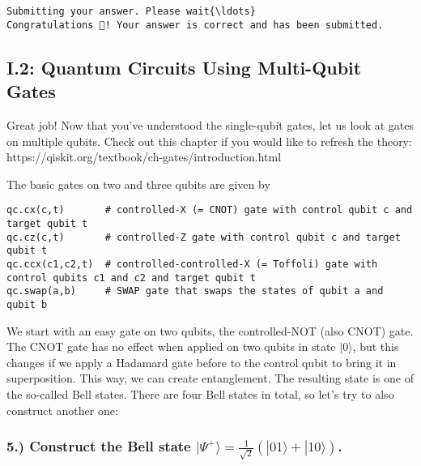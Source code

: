 \documentclass[11pt]{article}
\begin{document}
    \begin{Verbatim}[commandchars=\\\{\}]
Submitting your answer. Please wait{\ldots}
Congratulations 🎉! Your answer is correct and has been submitted.
    \end{Verbatim}

    \hypertarget{i.2-quantum-circuits-using-multi-qubit-gates}{%
\subsection{I.2: Quantum Circuits Using Multi-Qubit
Gates}\label{i.2-quantum-circuits-using-multi-qubit-gates}}

Great job! Now that you've understood the single-qubit gates, let us
look at gates on multiple qubits. Check out this chapter if you would
like to refresh the theory:
https://qiskit.org/textbook/ch-gates/introduction.html

The basic gates on two and three qubits are given by

\begin{verbatim}
qc.cx(c,t)       # controlled-X (= CNOT) gate with control qubit c and target qubit t
qc.cz(c,t)       # controlled-Z gate with control qubit c and target qubit t
qc.ccx(c1,c2,t)  # controlled-controlled-X (= Toffoli) gate with control qubits c1 and c2 and target qubit t
qc.swap(a,b)     # SWAP gate that swaps the states of qubit a and qubit b
\end{verbatim}

We start with an easy gate on two qubits, the controlled-NOT (also CNOT)
gate. The CNOT gate has no effect when applied on two qubits in state
\(|0\rangle\), but this changes if we apply a Hadamard gate before to
the control qubit to bring it in superposition. This way, we can create
entanglement. The resulting state is one of the so-called Bell states.
There are four Bell states in total, so let's try to also construct
another one:

\hypertarget{construct-the-bell-state-psirangle-frac1sqrt2left01rangle-10rangleright.}{%
\subsubsection{\texorpdfstring{5.) Construct the Bell state
\(|\Psi^+\rangle = \frac{1}{\sqrt{2}}\left(|01\rangle + |10\rangle\right)\).}{5.) Construct the Bell state \textbar\textbackslash Psi\^{}+\textbackslash rangle = \textbackslash frac\{1\}\{\textbackslash sqrt\{2\}\}\textbackslash left(\textbackslash rangle + \textbackslash rangle\textbackslash right).}}\label{construct-the-bell-state-psirangle-frac1sqrt2left01rangle-10rangleright.}}
\end{document}
